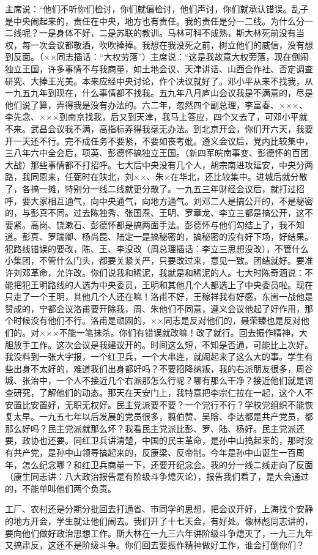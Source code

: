 主席说：“他们不听你们检讨，你们就偏检讨，他们声讨，你们就承认错误。乱子是中央闹起来的，责任在中央，地方也有责任。我的责任是分一二线。为什么分一二线呢？一是身体不好，二是苏联的教训。马林可科不成熟，斯大林死前没有当权，每一次会议都敬酒，吹吹捧捧。我想在我没死之前，树立他们的威信，没有想到反面。（××同志插话：“大权劳落”）主席说：“这是我故意大权旁落，现在倒闹独立王国，许多事情不与我商量，如土地会议、天津讲话、山西合作社、否定调查研究、大捧王光美。本来应经中央讨论，作个决议就好了。邓小平从来不找我，从一九五九年到现在，什么事情都不找我。五九年八月庐山会议我是不满意的，尽是他们说了算，弄得我是没有办法的。六二年，忽然四个副总理，李富春、×××、李先念、×××到南京找我，后又到天津，我马上答应，四个又去了，可邓小平就不来。武昌会议我不满，高指标弄得我毫无办法。到北京开会，你们开六天，我要开一天还不行。完不成任务不要紧，不要如丧考妣。遵义会议后，党内比较集中，三八年六中全会后，项英、彭德怀搞独立王国。（新四军皖南事变、彭德怀的百团大战）那些事情都不打招呼。七大后中央没有几个人，胡宗南进攻延安，中央分两路，我同恩来，任弼时在陕北，刘××、朱×在华北，还比较集中。进城后就分散了，各搞一摊，特别分一线二线就更分散了。一九五三年财经会议后，就打过招呼，要大家相互通气，向中央通气，向地方通气。刘邓二人是搞公开的，不是秘密的，与彭真不同。过去陈独秀、张国焘、王明、罗章龙、李立三都是搞公开，这不要紧。高岗、饶漱石、彭德怀都是搞两面手法。彭德怀与他们勾结上了，我不知道。彭真、罗瑞卿、杨尚昆、陆定一是搞秘密的，搞秘密的没有好下场，好结果。犯路线错误的要改，陈、王、李没改（周总理插话：李立三思想没改），不管什么小集团，不管什么门头，都要关紧关严，只要改过来，意见一致。团结就好。要准许刘邓革命，允许改。你们说我和稀泥，我就是和稀泥的人。七大时陈奇涵说：不能把犯王明路线的人选为中央委员，王明和其他几个人都选上了中央委员啦。现在只走了一个王明，其他几个人还在嘛！洛甫不好，王稼祥我有好感，东崮一战他是赞成的，宁都会议洛甫要开除我，周、朱他们不同意，遵义会议他起了好作用，那个时候没有他们不行。洛甫是顽固的，××同志是反对他们的，聂荣臻也是反对他们的。对×××不能一笔抹杀。你们有错误就改嘛！改了就行。回去振作精神，大胆放手工作。这次会议是我建议开的。时间这么短，不知是否通，可能比上次好。我没料到一张大字报，一个红卫兵，一个大串连，就闹起来了这么大的事。学生有些出身不太好的，难道我们出身都好吗？不要招降纳叛，我的右派朋友很多，周谷城、张治中，一个人不接近几个右派那怎么行呢？哪有那么干净？接近他们就是调查研究，了解他们的动态。那天在天安门上，我特意把李宗仁拉在一起，这个人不安置比安置好，无职无权好。民主党派要不要？一个党行不行？学校党组织不能恢复太早。一九五七年以后发展的党员很多，翦伯赞、吴晗、李达都是共产党员，都那么好吗？民主党派就那么坏？我看民主党派比彭、罗、陆、杨好。民主党派还要，政协也还要。同红卫兵讲清楚，中国的民主革命，是孙中山搞起来的，那时没有共产党，是孙中山领导搞起来的，反康梁、反帝制。今年是孙中山诞生一百周年，怎么纪念哪？和红卫兵商量一下，还要开纪念会。我的分一线二线走向了反面（康生同志讲：八大政治报告是有阶级斗争熄灭论），报告我们看了，是大会通过的，不能单叫他们两个负责。

工厂、农村还是分期分批回去打通省、市同学的思想，把会议开好，上海找个安静的地方开会，学生就让他们闹去。我们开了十七天会，有好处。像林彪同志讲的，要向他们做好政治思想工作。斯大林在一九三六年讲阶级斗争熄灭了，一九三九年又搞肃反，这还不是阶级斗争。你们回去要振作精神做好工作，谁会打倒你们？


